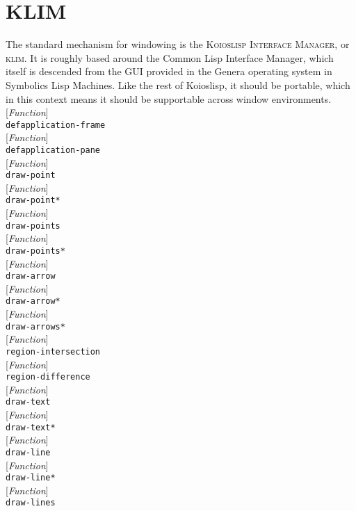 \documentclass[10pt]{book}
\newenvironment{defother}[2]{[\textit{#1}]\\\texttt{#2}}{\\}
\newenvironment{defun}[1]{\begin{defother}{Function}{#1}}{\end{defother}}
\begin{document}
\chapter{KLIM}
The standard mechanism for windowing is the \textsc{Koioslisp Interface Manager}, or \textsc{klim}. It is roughly based around the Common Lisp Interface Manager, which itself is descended from the GUI provided in the Genera operating system in Symbolics Lisp Machines. Like the rest of Koioslisp, it should be portable, which in this context means it should be supportable across window environments.\\
\begin{defun}{defapplication-frame}\end{defun}
\begin{defun}{defapplication-pane}\end{defun}
\begin{defun}{draw-point}\end{defun}
\begin{defun}{draw-point*}\end{defun}
\begin{defun}{draw-points}\end{defun}
\begin{defun}{draw-points*}\end{defun}
\begin{defun}{draw-arrow}\end{defun}
\begin{defun}{draw-arrow*}\end{defun}
\begin{defun}{draw-arrows*}\end{defun}
\begin{defun}{region-intersection}\end{defun}
\begin{defun}{region-difference}\end{defun}
\begin{defun}{draw-text}\end{defun}
\begin{defun}{draw-text*}\end{defun}
\begin{defun}{draw-line}\end{defun}
\begin{defun}{draw-line*}\end{defun}
\begin{defun}{draw-lines}\end{defun}
\end{document}
